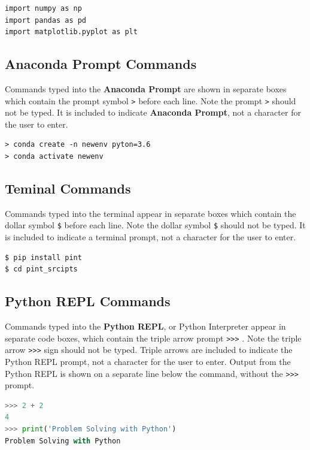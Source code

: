 \documentclass{book}
\begin{document}
\begin{lstlisting}
import numpy as np
import pandas as pd
import matplotlib.pyplot as plt
\end{lstlisting}

    \subsection{Anaconda Prompt Commands}\label{anaconda-prompt-commands}

Commands typed into the \textbf{Anaconda Prompt} are shown in separate
boxes which contain the prompt symbol \lstinline!>! before each line.
Note the prompt \lstinline!>! should not be typed. It is included to
indicate \textbf{Anaconda Prompt}, not a character for the user to
enter.

\begin{lstlisting}
> conda create -n newenv pyton=3.6
> conda activate newenv
\end{lstlisting}

    \subsection{Teminal Commands}\label{teminal-commands}

Commands typed into the terminal appear in separate boxes which contain
the dollar symbol \lstinline!$! before each line. Note the dollar symbol
\lstinline!$! should not be typed. It is included to indicate a terminal
prompt, not a character for the user to enter.

\begin{lstlisting}
$ pip install pint
$ cd pint_srcipts
\end{lstlisting}

    \subsection{Python REPL Commands}\label{python-repl-commands}

Commands typed into the \textbf{Python REPL}, or Python Interpreter
appear in separate code boxes, which contain the triple arrow prompt
\lstinline!>>>! . Note the triple arrow \lstinline!>>>! sign should not
be typed. Triple arrows are included to indicate the Python REPL prompt,
not a character for the user to enter. Output from the Python REPL is
shown on a separate line below the command, without the \lstinline!>>>!
prompt.

\begin{lstlisting}[language=Python]
>>> 2 + 2
4
>>> print('Problem Solving with Python')
Problem Solving with Python
\end{lstlisting}
\end{document}
